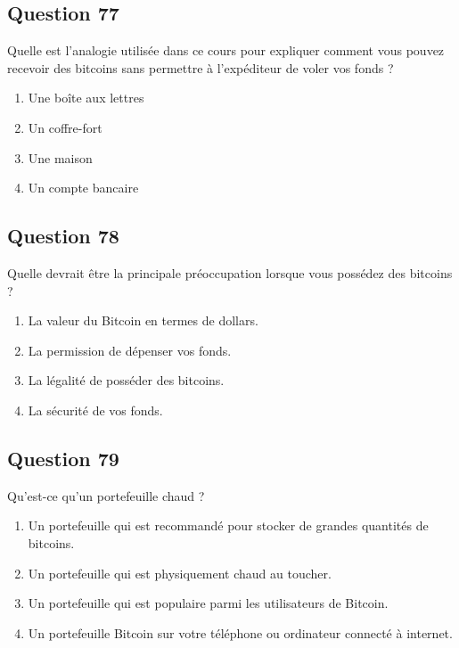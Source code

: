 \documentclass[12pt,a4paper]{article}
\begin{document}
\bigskip


\subsection*{Question 77}
Quelle est l'analogie utilisée dans ce cours pour expliquer comment vous pouvez recevoir des bitcoins sans permettre à l'expéditeur de voler vos fonds ?

\begin{enumerate}[label=\Alph*., leftmargin=*]
\item Une boîte aux lettres
\item Un coffre-fort
\item Une maison
\item Un compte bancaire
\end{enumerate}

\bigskip


\subsection*{Question 78}
Quelle devrait être la principale préoccupation lorsque vous possédez des bitcoins ?

\begin{enumerate}[label=\Alph*., leftmargin=*]
\item La valeur du Bitcoin en termes de dollars.
\item La permission de dépenser vos fonds.
\item La légalité de posséder des bitcoins.
\item La sécurité de vos fonds.
\end{enumerate}

\bigskip


\subsection*{Question 79}
Qu'est-ce qu'un portefeuille chaud ?

\begin{enumerate}[label=\Alph*., leftmargin=*]
\item Un portefeuille qui est recommandé pour stocker de grandes quantités de bitcoins.
\item Un portefeuille qui est physiquement chaud au toucher.
\item Un portefeuille qui est populaire parmi les utilisateurs de Bitcoin.
\item Un portefeuille Bitcoin sur votre téléphone ou ordinateur connecté à internet.
\end{enumerate}
\end{document}

